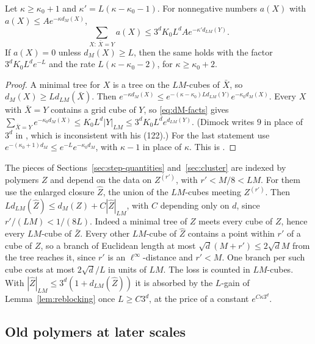 \begin{lemma}\label{lem:reblocking}
Let $\kappa\ge\kappa_0+1$ and $\kappa'=L(\kappa-\kappa_0-1)$. For nonnegative numbers $a(X)$ with $a(X)\le Ae^{-\kappa d_M(X)}$,
\[
\sum_{X:\,\bar X=Y}a(X)\le3^dK_0L^dAe^{-\kappa'd_{LM}(Y)} .
\]
If $a(X)=0$ unless $d_M(X)\ge L$, then the same holds with the factor $3^dK_0L^de^{-L}$ and the rate $L(\kappa-\kappa_0-2)$, for $\kappa\ge\kappa_0+2$.
\end{lemma}

\begin{proof}
A minimal tree for $X$ is a tree on the $LM$-cubes of $\bar X$, so $d_M(X)\ge Ld_{LM}(\bar X)$. Then $e^{-\kappa d_M(X)}\le e^{-(\kappa-\kappa_0)Ld_{LM}(Y)}e^{-\kappa_0d_M(X)}$. Every $X$ with $\bar X=Y$ contains a grid cube of $Y$, so \eqref{eq:dM-facts} gives $\sum_{\bar X=Y}e^{-\kappa_0d_M(X)}\le K_0L^d|Y|_{LM}\le3^dK_0L^de^{d_{LM}(Y)}$. (Dimock writes $9$ in place of $3^d$ in \cite[(132)]{DimockI}, which is inconsistent with his (122).) For the last statement use $e^{-(\kappa_0+1)d_M}\le e^{-L}e^{-\kappa_0d_M}$, with $\kappa-1$ in place of $\kappa$. This is \cite[(130)--(132), (139)]{DimockI}.
\end{proof}

\begin{remark}\label{rem:reblock-margins}
The pieces of Sections~\ref{sec:step-quantities} and~\ref{sec:cluster} are indexed by polymers $Z$ and depend on the data on $Z^{(r')}$, with $r'<M/8<LM$. For them use the enlarged closure $\hat Z$, the union of the $LM$-cubes meeting $Z^{(r')}$. Then $Ld_{LM}(\hat Z)\le d_M(Z)+C|\hat Z|_{LM}$, with $C$ depending only on $d$, since $r'/(LM)<1/(8L)$. Indeed a minimal tree of $Z$ meets every cube of $Z$, hence every $LM$-cube of $\bar Z$. Every other $LM$-cube of $\hat Z$ contains a point within $r'$ of a cube of $Z$, so a branch of Euclidean length at most $\sqrt d(M+r')\le2\sqrt dM$ from the tree reaches it, since $r'$ is an $\ell^\infty$-distance and $r'<M$. One branch per such cube costs at most $2\sqrt d/L$ in units of $LM$. The loss is counted in $LM$-cubes. With $|\hat Z|_{LM}\le3^d(1+d_{LM}(\hat Z))$ it is absorbed by the $L$-gain of Lemma~\ref{lem:reblocking} once $L\ge C3^d$, at the price of a constant $e^{C\kappa3^d}$.
\end{remark}

\subsection{Old polymers at later scales}\label{subsec:flow-classes}

